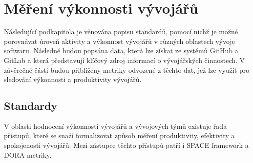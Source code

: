 \section{Měření výkonnosti vývojářů}
Následující podkapitola je věnována popisu standardů, pomocí nichž je možné porovnávat úroveň aktivity a výkonnost vývojářů v různých oblastech vývoje softwaru. Následně budou popsána data, která lze získat ze systémů GitHub a GitLab a která představují klíčový zdroj informací o vývojářských činnostech. V závěrečné části budou přiblíženy metriky odvozené z těchto dat, jež lze využít pro sledování výkonnosti a produktivity vývojářů.

\subsection{Standardy}\label{section:metrics-standards}
V oblasti hodnocení výkonnosti vývojářů a vývojových týmů existuje řada přístupů, které se snaží formalizovat způsob měření produktivity, efektivity a spokojenosti vývojářů. Mezi zástupce těchto přístupů patří i SPACE framework a DORA metriky.

